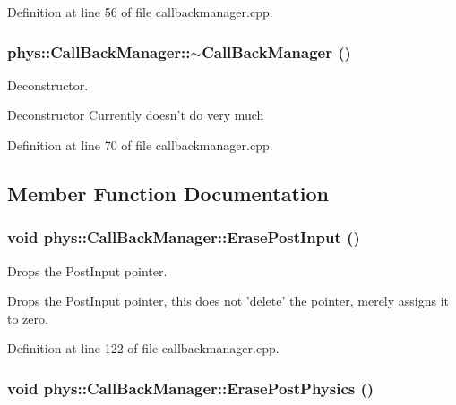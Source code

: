 Definition at line 56 of file callbackmanager.cpp.

\hypertarget{classphys_1_1CallBackManager_a098b7a7822538aa6d6c4ba690f1e069d}{
\subsubsection[{$\sim$CallBackManager}]{\setlength{\rightskip}{0pt plus 5cm}phys::CallBackManager::$\sim$CallBackManager ()}}
\label{d1/d47/classphys_1_1CallBackManager_a098b7a7822538aa6d6c4ba690f1e069d}


Deconstructor. 

Deconstructor Currently doesn't do very much 

Definition at line 70 of file callbackmanager.cpp.



\subsection{Member Function Documentation}
\hypertarget{classphys_1_1CallBackManager_a84ccf382be58b42439869ec9b77a0f89}{
\subsubsection[{ErasePostInput}]{\setlength{\rightskip}{0pt plus 5cm}void phys::CallBackManager::ErasePostInput ()}}
\label{d1/d47/classphys_1_1CallBackManager_a84ccf382be58b42439869ec9b77a0f89}


Drops the PostInput pointer. 

Drops the PostInput pointer, this does not 'delete' the pointer, merely assigns it to zero. 

Definition at line 122 of file callbackmanager.cpp.

\hypertarget{classphys_1_1CallBackManager_a2d03573a93606e9d3fcd7adad5c8c397}{
\subsubsection[{ErasePostPhysics}]{\setlength{\rightskip}{0pt plus 5cm}void phys::CallBackManager::ErasePostPhysics ()}}
\label{d1/d47/classphys_1_1CallBackManager_a2d03573a93606e9d3fcd7adad5c8c397}


